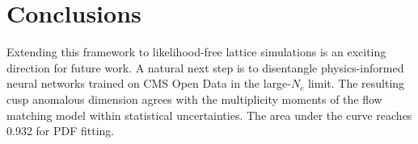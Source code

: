 \section{Conclusions}\label{sec:conclusions}

Extending this framework to likelihood-free lattice simulations is an
exciting direction for future work. A natural next step is to
disentangle physics-informed neural networks trained on CMS Open Data in
the large-$N_c$ limit. The resulting cusp anomalous dimension agrees
with the multiplicity moments of the flow matching model within
statistical uncertainties. The area under the curve reaches 0.932 for
PDF fitting.


